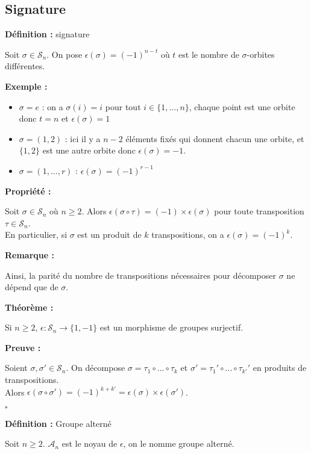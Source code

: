 \documentclass{report}
\renewenvironment{leftbar}{%
  \def\FrameCommand{\vrule width 0.4pt \hspace{10pt}}%
  \MakeFramed {\advance\hsize-\width \FrameRestore}}%
 {\endMakeFramed}%
\newenvironment{definition}[1][]{
    \begin{tcolorbox}[colframe= white]
    \textbf{Définition :} 
    #1 \par
    }
    {\end{tcolorbox}}
\newenvironment{preuve}{\vspace*{0.5cm}
    \begin{leftbar}
    \noindent\textbf{Preuve :}\par}{
    \begin{flushright}
    $\square$
    \end{flushright}
    \end{leftbar}
}
\newenvironment{prop}{\begin{tcolorbox}[colframe= white]
    \textbf{Propriété :}
     \par}
    {\end{tcolorbox}}
\newenvironment{exemple}{\begin{tcolorbox}[colframe= white]
    \textbf{Exemple :}
     \par}
    {\end{tcolorbox}}
\newenvironment{theoreme}[1][]{
    \begin{tcolorbox}[]
    \textbf{Théorème :} #1  \par} 
    {\end{tcolorbox}}
\newcommand{\remarque}{
    \noindent\textbf{Remarque :} \par
}
\newcommand{\sn}{\mathcal{S}_{n}}
\newcommand{\an}{\mathcal{A}_{n}}
\newcommand{\unn}{\{1, ..., n\}}
\newcommand{\sign}{\epsilon(\sigma)}
\begin{document}
\subsection{Signature}
\begin{definition}[signature]
Soit $\sigma\in\sn$. On pose $\epsilon(\sigma)=(-1)^{n-t}$ où $t$ est le nombre de $\sigma$-orbites différentes.
\end{definition}

\begin{exemple}
\begin{itemize}[label=$\bullet$]
\item $\sigma=e$ : on a $\sigma(i)=i$ pour tout $i\in\unn$, chaque point est une orbite donc $t=n$ et $\sign=1$
\item $\sigma=(1,2)$ : ici il y a $n-2$ éléments fixés qui donnent chacun une orbite, et $\{1,2\}$ est une autre orbite donc $\sign=-1$.
\item $\sigma=(1,...,r)$ : $\sign=(-1)^{r-1}$
\end{itemize}
\end{exemple}

\begin{prop}
Soit $\sigma\in\sn$ où $n\geq2$. Alors $\epsilon(\sigma\circ\tau)=(-1)\times\sign$ pour toute transposition $\tau\in\sn$.\\
En particulier, si $\sigma$ est un produit de $k$ transpositions, on a $\sign=(-1)^k$.
\end{prop}

\remarque{Ainsi, la parité du nombre de transpositions nécessaires pour décomposer $\sigma$ ne dépend que de $\sigma$.}

\begin{theoreme}
Si $n\geq2$, $\epsilon:\sn\longrightarrow\{1,-1\}$ est un morphisme de groupes surjectif.
\end{theoreme}
\begin{preuve}
Soient $\sigma,\sigma'\in\sn$. On décompose $\sigma=\tau_1\circ...\circ\tau_k$ et $\sigma'=\tau_1'\circ...\circ\tau_{k'}'$ en produits de transpositions. \\Alors $\epsilon(\sigma\circ\sigma')=(-1)^{k+k'}=\sign\times\epsilon(\sigma')$.
\end{preuve}

\begin{definition}[Groupe alterné]
Soit $n\geq2$. $\an$ est le noyau de $\epsilon$, on le nomme groupe alterné.
\end{definition}

\par
\par
\end{document}
